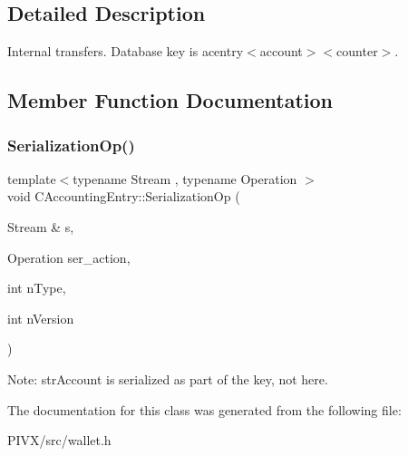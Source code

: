 \subsection{Detailed Description}
Internal transfers. Database key is acentry$<$account$>$$<$counter$>$. 

\subsection{Member Function Documentation}
\mbox{\label{class_c_accounting_entry_ab30195f9f97f8f7ceb17360c24a39676}} 
\subsubsection{\texorpdfstring{Serialization\+Op()}{SerializationOp()}}
{\footnotesize\ttfamily template$<$typename Stream , typename Operation $>$ \\
void C\+Accounting\+Entry\+::\+Serialization\+Op (\begin{DoxyParamCaption}\item[{Stream \&}]{s,  }\item[{Operation}]{ser\+\_\+action,  }\item[{int}]{n\+Type,  }\item[{int}]{n\+Version }\end{DoxyParamCaption})\hspace{0.3cm}{\ttfamily [inline]}}

Note\+: str\+Account is serialized as part of the key, not here. 

The documentation for this class was generated from the following file\+:\begin{DoxyCompactItemize}
\item 
P\+I\+V\+X/src/wallet.\+h\end{DoxyCompactItemize}
